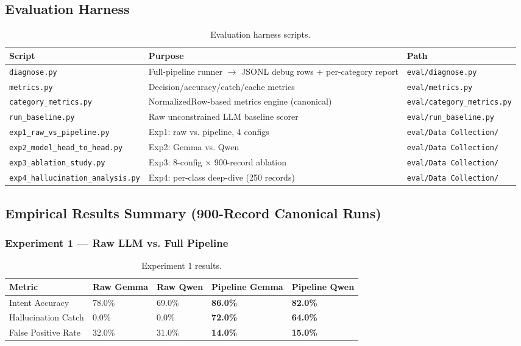 \documentclass[10pt,journal,onecolumn]{IEEEtran}
\begin{document}
\subsection{Evaluation Harness}
\begin{table}[t]
\caption{Evaluation harness scripts.}
\label{tab:evalharness}
\begin{tabularx}{\textwidth}{>{\ttfamily}l X X}
\toprule
\textbf{Script} & \textbf{Purpose} & \textbf{Path}\\
\midrule
\texttt{diagnose.py} & Full-pipeline runner $\rightarrow$ JSONL debug rows + per-category report & \texttt{eval/diagnose.py}\\
\texttt{metrics.py} & Decision/accuracy/catch/cache metrics & \texttt{eval/metrics.py}\\
\texttt{category\_metrics.py} & NormalizedRow-based metrics engine (canonical) & \texttt{eval/category\_metrics.py}\\
\texttt{run\_baseline.py} & Raw unconstrained LLM baseline scorer & \texttt{eval/run\_baseline.py}\\
\texttt{exp1\_raw\_vs\_pipeline.py} & Exp1: raw vs. pipeline, 4 configs & \texttt{eval/Data Collection/}\\
\texttt{exp2\_model\_head\_to\_head.py} & Exp2: Gemma vs. Qwen & \texttt{eval/Data Collection/}\\
\texttt{exp3\_ablation\_study.py} & Exp3: 8-config $\times$ 900-record ablation & \texttt{eval/Data Collection/}\\
\texttt{exp4\_hallucination\_analysis.py} & Exp4: per-class deep-dive (250 records) & \texttt{eval/Data Collection/}\\
\bottomrule
\end{tabularx}
\end{table}

\subsection{Empirical Results Summary (900-Record Canonical Runs)}

\subsubsection{Experiment 1 --- Raw LLM vs. Full Pipeline}
\begin{table}[h]
\caption{Experiment 1 results.}
\label{tab:exp1}
\begin{tabularx}{\columnwidth}{l X X X X}
\toprule
\textbf{Metric} & \textbf{Raw Gemma} & \textbf{Raw Qwen} & \textbf{Pipeline Gemma} & \textbf{Pipeline Qwen}\\
\midrule
Intent Accuracy & 78.0\% & 69.0\% & \textbf{86.0\%} & \textbf{82.0\%}\\
Hallucination Catch & 0.0\% & 0.0\% & \textbf{72.0\%} & \textbf{64.0\%}\\
False Positive Rate & 32.0\% & 31.0\% & \textbf{14.0\%} & \textbf{15.0\%}\\
\bottomrule
\end{tabularx}
\end{table}
\end{document}
